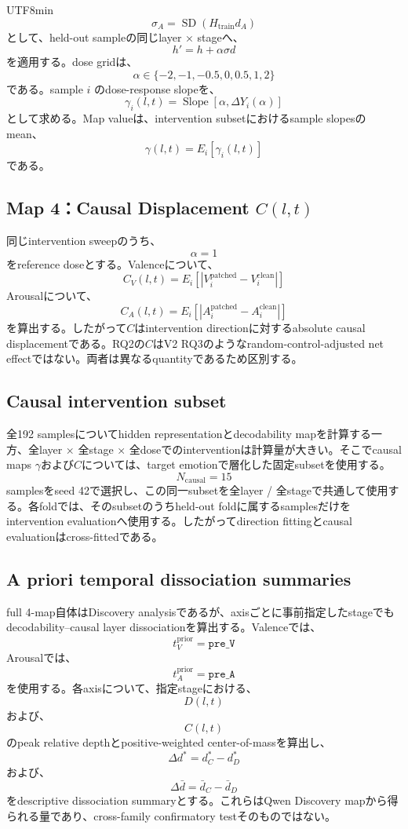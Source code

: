 \documentclass{article} %
\begin{document}
\begin{CJK*}{UTF8}{min}
\[
\sigma_A
=
\operatorname{SD}(H_{\mathrm{train}}d_A)
\]
として、held-out sampleの同じlayer × stageへ、
\[
h'
=
h+\alpha\sigma d
\]
を適用する。dose gridは、
\[
\alpha
\in
\{
-2,-1,-0.5,0,0.5,1,2
\}
\]
である。sample \(i\) のdose-response slopeを、
\[
\gamma_i(l,t)
=
\operatorname{Slope}
[
\alpha,
\Delta Y_i(\alpha)
]
\]
として求める。Map valueは、intervention subsetにおけるsample slopesのmean、
\[
\gamma(l,t)
=
E_i[
\gamma_i(l,t)
]
\]
である。


\subsection{Map 4：Causal Displacement \(C(l,t)\)}

同じintervention sweepのうち、
\[
\alpha=1
\]
をreference doseとする。Valenceについて、
\[
C_V(l,t)
=
E_i
\left[
\left|
V_i^{\mathrm{patched}}
-
V_i^{\mathrm{clean}}
\right|
\right]
\]
Arousalについて、
\[
C_A(l,t)
=
E_i
\left[
\left|
A_i^{\mathrm{patched}}
-
A_i^{\mathrm{clean}}
\right|
\right]
\]
を算出する。したがって\(C\)はintervention directionに対するabsolute causal displacementである。RQ2の\(C\)はV2 RQ3のようなrandom-control-adjusted net effectではない。両者は異なるquantityであるため区別する。


\subsection{Causal intervention subset}

全192 samplesについてhidden representationとdecodability mapを計算する一方、全layer × 全stage × 全doseでのinterventionは計算量が大きい。そこでcausal maps \(\gamma\)および\(C\)については、target emotionで層化した固定subsetを使用する。
\[
N_{\mathrm{causal}}=15
\]
samplesをseed 42で選択し、この同一subsetを全layer / 全stageで共通して使用する。各foldでは、そのsubsetのうちheld-out foldに属するsamplesだけをintervention evaluationへ使用する。したがってdirection fittingとcausal evaluationはcross-fittedである。


\subsection{A priori temporal dissociation summaries}

full 4-map自体はDiscovery analysisであるが、axisごとに事前指定したstageでもdecodability--causal layer dissociationを算出する。Valenceでは、
\[
t_V^{\mathrm{prior}}
=
\texttt{pre\_V}
\]
Arousalでは、
\[
t_A^{\mathrm{prior}}
=
\texttt{pre\_A}
\]
を使用する。各axisについて、指定stageにおける、
\[
D(l,t)
\]
および、
\[
C(l,t)
\]
のpeak relative depthとpositive-weighted center-of-massを算出し、
\[
\Delta d^{*}
=
d_C^{*}-d_D^{*}
\]
および、
\[
\Delta\bar d
=
\bar d_C-\bar d_D
\]
をdescriptive dissociation summaryとする。これらはQwen Discovery mapから得られる量であり、cross-family confirmatory testそのものではない。



\end{CJK*}
\end{document}

